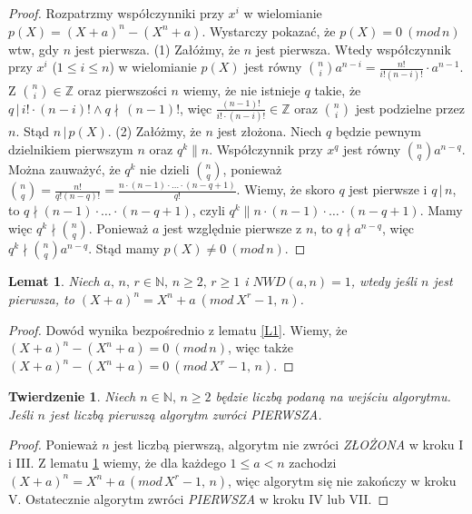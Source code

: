 \documentclass[declaration,shortabstract]{iithesis}
\theoremstyle{definition}
\theoremstyle{remark} \newtheorem{observation}{Obserwacja}
\theoremstyle{plain} \newtheorem{theorem}{Twierdzenie}
\theoremstyle{plain} \newtheorem{lemma}{Lemat}
\theoremstyle{remark} \newtheorem*{remark*}{Uwaga}
\theoremstyle{reminder} \newtheorem*{reminder*}{Przypomnienie}
\begin{document}
\begin{proof}
	Rozpatrzmy współczynniki przy $x^i$ w wielomianie $p(X) = (X + a)^n - (X^n + a)$. Wystarczy pokazać, że $p(X) = 0 \: (mod \, n)$ wtw, gdy $n$ jest pierwsza.\newline
	(1) Załóżmy, że $n$ jest pierwsza. Wtedy współczynnik przy $x^i$ ($1 \leq i \leq n$) w wielomianie $p(X)$ jest równy ${n \choose i}a^{n-i} = \frac{n!}{i!(n-i)!} \cdot a^{n-1}$. Z ${n \choose i} \in \mathbb{Z}$ oraz pierwszości $n$ wiemy, że nie istnieje $q$ takie, że $q \, | \, i! \cdot (n-i)! \wedge q \nmid \, (n - 1)!$, więc $\frac{(n - 1)!}{i! \cdot (n - i)!} \in \mathbb{Z}$ oraz ${n \choose i}$ jest podzielne przez $n$. Stąd $n \, | \, p(X)$. \newline
	(2) Załóżmy, że $n$ jest złożona. Niech $q$ będzie pewnym dzielnikiem pierwszym $n$ oraz $q^k \parallel n$. Współczynnik przy $x^q$ jest równy ${n \choose q}a^{n-q}$. Można zauważyć, że $q^k$ nie dzieli ${n \choose q}$, ponieważ ${n \choose q} = \frac{n!}{q!(n-q)!} = \frac{n \cdot (n-1) \cdot \dots \cdot (n - q + 1)}{q!}$. Wiemy, że skoro $q$ jest pierwsze i $q \,| \, n$, to $q \nmid (n-1) \cdot \dots \cdot (n - q + 1)$, czyli $q^k \parallel n \cdot (n-1) \cdot \dots \cdot (n - q + 1)$. Mamy więc $q^k \nmid {n \choose q}$. Ponieważ $a$ jest względnie pierwsze z $n$, to $q \nmid a^{n-q}$, więc $q^k \nmid {n \choose q}a^{n-q}$. Stąd mamy $p(X) \neq 0 \: (mod \, n)$.
\end{proof}

\begin{lemma} \label{L2}
	Niech $a,\, n, \, r \in \mathbb{N},\, n \geq 2,\, r \geq 1$ i $NWD(a, n) = 1$, wtedy jeśli $n$ jest pierwsza, to $(X + a)^n = X^n + a \: (mod \: X^r - 1,\, n)$.
\end{lemma}
	
\begin{proof}
	Dowód wynika bezpośrednio z lematu \ref{L1}. Wiemy, że $(X + a)^n - (X^n + a) = 0 \: (mod \, n)$, więc także $(X + a)^n - (X^n + a) = 0 \: (mod \: X^r - 1,\, n)$.
\end{proof}

\begin{theorem}
	Niech $n \in \mathbb{N}, \, n \geq 2$ będzie liczbą podaną na wejściu algorytmu. Jeśli $n$ jest liczbą pierwszą algorytm zwróci \textit{PIERWSZA}.
\end{theorem}
	
\begin{proof}
	Ponieważ $n$ jest liczbą pierwszą, algorytm nie zwróci \textit{ZŁOŻONA} w kroku I i III. Z lematu \ref{L2} wiemy, że dla każdego $1 \leq a < n$ zachodzi $(X + a)^n = X^n + a \, (mod \, X^r - 1, \, n)$, więc algorytm się nie zakończy w kroku V. Ostatecznie algorytm zwróci \textit{PIERWSZA} w kroku IV lub VII.
\end{proof}
\end{document}
